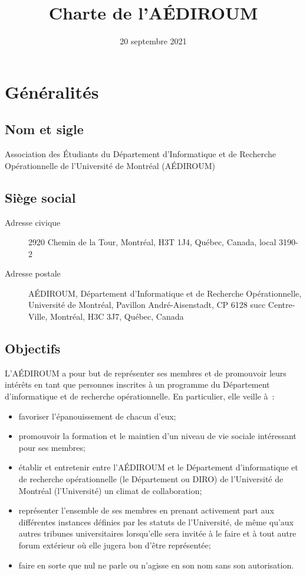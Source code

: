 \documentclass{aediroum}
\title{Charte de l'AÉDIROUM}
\date{20 septembre 2021}
\begin{document}
\maketitle

\section{Généralités}\label{sec:generalites}

\subsection{Nom et sigle}\label{sec:nom-et-sigle}
Association des Étudiants du Département d'Informatique et de Recherche Opérationnelle de l'Université de Montréal (AÉDIROUM)

\subsection{Siège social}\label{sec:siege-social}
  \begin{description}
  \item[Adresse civique] 2920 Chemin de la Tour, Montréal, H3T 1J4, Québec, Canada, local 3190-2
  \item[Adresse postale] AÉDIROUM, Département d'Informatique et de Recherche Opérationnelle, Université de Montréal, Pavillon André-Aisenstadt, CP 6128 succ Centre-Ville, Montréal, H3C 3J7, Québec, Canada
  \end{description}

\subsection{Objectifs}\label{sec:objectifs}

L'AÉDIROUM a pour but de représenter ses membres et de promouvoir leurs intérêts en tant que personnes inscrites à un programme du Département d'informatique et de recherche opérationnelle. En particulier, elle veille à~:
\begin{itemize}
\item favoriser l'épanouissement de chacun d'eux;
\item promouvoir la formation et le maintien d'un niveau de vie sociale intéressant pour ses membres;
\item établir et entretenir entre l'AÉDIROUM et le Département d'informatique et de recherche opérationnelle (le Département ou DIRO) de l'Université de Montréal (l'Université) un climat de collaboration;
\item représenter l'ensemble de ses membres en prenant activement part aux différentes instances définies par les statuts de l'Université, de même qu'aux autres tribunes universitaires lorsqu'elle sera invitée à le faire et à tout autre forum extérieur où elle jugera bon d'être représentée;
\item faire en sorte que nul ne parle ou n'agisse en son nom sans son autorisation.
\end{itemize}
\end{document}

